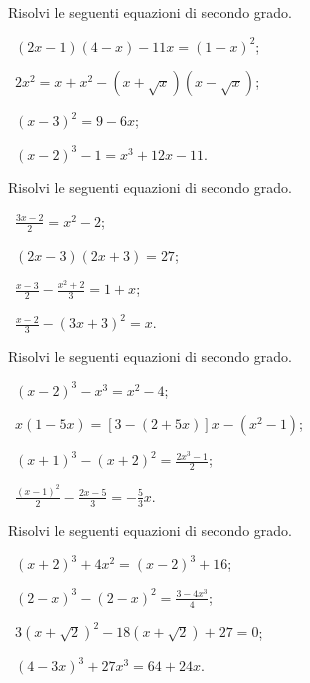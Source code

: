 \begin{esercizio}[\Ast]
 \label{ese:3.26}
Risolvi le seguenti equazioni di secondo grado.
\begin{multicols}{2}
 \begin{enumeratea}
 \item~$(2 x-1) (4-x)-11 x = (1-x)^{2}$;
 \item~$2x^{2} = x + x^{2}-(x + \sqrt{x}) (x-\sqrt{x})$;
 \item~$(x-3)^{2} = 9-6 x$;
 \item~$(x-2)^{3}-1 = x^{3} + 12 x-11$.
 \end{enumeratea}
 \end{multicols}
\end{esercizio}

\begin{esercizio}[\Ast]
 \label{ese:3.27}
Risolvi le seguenti equazioni di secondo grado.
\begin{multicols}{2}
 \begin{enumeratea}
 \item~$\frac{3 x-2}{2} = x^{2}-2$;
 \item~$(2 x-3) (2 x + 3) = 27$;
 \item~$\frac{x-3}{2}-\frac{x^{2} + 2}{3} = 1 + x$;
 \item~$\frac{x-2}{3}-(3 x + 3)^{2} = x$.
 \end{enumeratea}
 \end{multicols}
\end{esercizio}

\begin{esercizio}[\Ast]
 \label{ese:3.28}
Risolvi le seguenti equazioni di secondo grado.
\begin{multicols}{2}
 \begin{enumeratea}
 \item~$(x-2)^{3}-x^{3} = x^{2}-4$;
 \item~$x (1-5 x) = [ 3-(2 + 5 x) ] x-(x^{2}-1)$;
 \item~$(x + 1)^{3}-(x + 2)^{2} = \frac{2 x^{3}-1}{2}$;
 \item~$\frac{(x-1)^{2}}{2}-\frac{2 x-5}{3} =-\frac{5}{3} x$.
 \end{enumeratea}
 \end{multicols}
\end{esercizio}

\begin{esercizio}[\Ast]
 \label{ese:3.29}
Risolvi le seguenti equazioni di secondo grado.
\begin{multicols}{2}
 \begin{enumeratea}
 \item~$(x + 2)^{3} + 4 x^{2} = (x-2)^{3} + 16$;
 \item~$(2-x)^{3}-(2-x)^{2} = \frac{3-4 x^{3}}{4}$;
 \item~$3 \left(x + \sqrt{2} \right)^{2}-18 \left(x + \sqrt{2}\right) + 27 = 0$;
 \item~$(4-3 x)^{3} + 27 x^{3} = 64 + 24 x$.
 \end{enumeratea}
 \end{multicols}
\end{esercizio}

